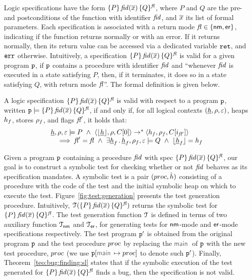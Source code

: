 \jsil Logic specifications have the form $\{ P \} \, \mathit{fid}(\overline{x}) \, \{ Q \}^{\mathit{fl}}$, where $P$ and $Q$ are the 
pre- and postconditions of the function with identifier $\mathit{fid}$, and $\overline{x}$ its list of formal parameters.
Each specification is associated with a return mode $\mathit{fl} \in \{ {\sf nm}, {\sf er} \}$, indicating if the function
 returns normally or with an error. If it returns normally, then its return value can be accessed  via a dedicated variable 
 $\mathtt{ret}$, and $\mathtt{err}$ otherwise.  Intuitively, a specification $\{ P \} \, \mathit{fid}(\overline{x}) \, \{ Q \}^{\mathit{fl}}$ is 
valid for a given \jsil program $\mathtt{p}$, if $\mathtt{p}$ contains a procedure with identifier 
$\mathit{fid}$ and ``whenever $\mathit{fid}$ is executed in a state satisfying $P$, then, 
if it terminates, it does so in a state satisfying $Q$, with return mode $\mathit{fl}$''.
The formal definition is given below. 


\begin{definition}
A \jsil logic specification $\{ P \} \, \mathit{fid}(\overline{x}) \, \{ Q \}^{\mathit{fl}}$ is valid with respect to a program 
$\mathtt{p}$, written $\mathtt{p} \models \{ P \} \, \mathit{fid}(\overline{x}) \, \{ Q \}^{\mathit{fl}}$,  if and only if, for all logical 
contexts $(\underline{h}, \rho, \varepsilon)$, heaps $h_f$, stores $\rho_f$, and flags $\mathit{fl}'$, it holds that: 
$$
\begin{array}{l}
    \iheap, \store, \senv \satisfies P \ \wedge \ \tuple{\deabstract{\iheap}, \store, \ctx[0]} \rightarrow^* \tuple{\heap_f, \store_f, \ctx[i_{\flag'}]} \\
       \quad \implies
            \flag' = \flag \ \wedge \ \exists \iheap_f \, . \, \iheap_f, \store_f, \senv \satisfies Q \ \wedge \ \deabstract{\iheap_f} = \heap_f
\end{array}
$$
\end{definition}

\noindent Given a \jsil program $\mathtt{p}$ containing a procedure $\mathit{fid}$ with spec {\small $\{ P \} \, \mathit{fid}(\overline{x}) \, \{ Q \}^{\mathit{fl}}$}, 
our goal is to construct a symbolic test for checking whether or not $\mathit{fid}$ behaves as its specification mandates.
A symbolic test is a pair $(proc, \hat{h})$ consisting of a \jsil procedure with the code of the test and the initial 
symbolic heap on which to execute the test. 
%
Figure~\ref{fig:test:generation} presents the test generation procedure. Intuitively, ${\cal T}_{}(\{ P \} \, \mathit{fid}(\overline{x}) \, \{ Q \}^{\mathit{fl}})$ 
returns the symbolic test for $\{ P \} \, \mathit{fid}(\overline{x}) \, \{ Q \}^{\mathit{fl}}$. The test generation function ${\cal T}_{}$ is defined in terms 
of two auxiliary function ${\cal T}_{{\sf nm}}$ and ${\cal T}_{{\sf er}}$, for generating tests for ${\sf nm}$-mode and 
${\sf er}$-mode specifications respectively. 
The test program $\mathtt{p}'$ is obtained from the original program $\mathtt{p}$ and the test procedure $proc$ by replacing the 
$\jsilmain$ of $\mathtt{p}$ with the new test procedure, $proc$ (we use $\prog[\jsilmain \mapsto \proc]$
to denote such $\mathtt{p}'$). 
%
Finally, Theorem~\ref{teo:bug:finding:sl} states that if the symbolic execution of the 
test generated for $\{ P \} \, \mathit{fid}(\overline{x}) \, \{ Q \}^{\mathit{fl}}$ finds a bug, then the specification 
is not valid.

